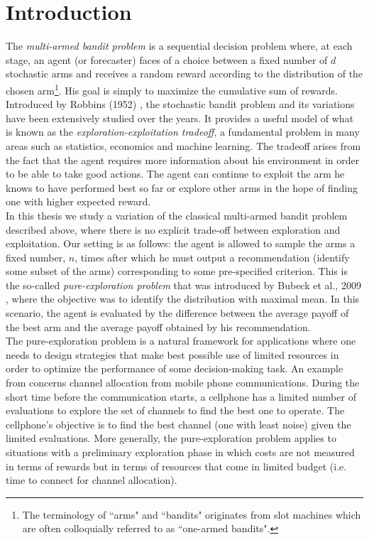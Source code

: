 \documentclass[11.75pt,oneside]{amsart}
\begin{document}
\newpage

\tableofcontents

\newpage

\section{Introduction} \label{sec:intro}
The \emph{multi-armed bandit problem} is a sequential decision problem where, at each stage, an agent (or forecaster) faces of a choice between a fixed number of $d$ stochastic arms and receives a random reward according to the distribution of the chosen arm\footnote{The terminology of ``arms" and ``bandits" originates from slot machines which are often colloquially referred to as ``one-armed bandits".}. His goal is simply to maximize the cumulative sum of rewards.\\

Introduced by Robbins (1952) \cite{Rob52}, the stochastic bandit problem and its variations have been extensively studied over the years. It provides a useful model of what is known as the \emph{exploration-exploitation tradeoff}, a fundamental problem in many areas such as statistics, economics and machine learning. The tradeoff arises from the fact that the agent requires more information about his environment in order to be able to take good actions. The agent can continue to exploit the arm he knows to have performed best so far or explore other arms in the hope of finding one with higher expected reward.\\

In this thesis we study a variation of the classical multi-armed bandit problem described above, where there is no explicit trade-off between exploration and exploitation. Our setting is as follows: the agent is allowed to sample the arms a fixed number, $n$, times after which he must output a recommendation (identify some subset of the arms) corresponding to some pre-specified criterion. This is the so-called \emph{pure-exploration problem} that was introduced by Bubeck et al., 2009 \cite{BMS09}, where the objective  was to identify the distribution with maximal mean. In this scenario, the agent is evaluated by the difference between the average payoff of the best arm and the average payoff obtained by his recommendation.\\

The pure-exploration problem is a natural framework for applications where one needs to design strategies that make best possible use of limited resources in order to optimize the performance of some decision-making task. An example from \cite{BMS09} concerns channel allocation from mobile phone communications. During the short time before the communication starts, a cellphone has a limited number of evaluations to explore the set of channels to find the best one to operate. The cellphone's objective is to find the best channel (one with least noise) given the limited evaluations. More generally, the pure-exploration problem applies to situations with a preliminary exploration phase in which costs are not measured in terms of rewards but in terms of resources that come in limited budget (i.e. time to connect for channel allocation). \\
\end{document}

